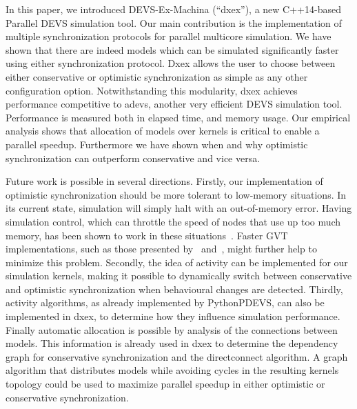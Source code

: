 In this paper, we introduced DEVS-Ex-Machina (``dxex''), a new C++14-based \textsf{Parallel DEVS} simulation tool.
Our main contribution is the implementation of multiple synchronization protocols for parallel multicore simulation.
We have shown that there are indeed models which can be simulated significantly faster using either synchronization protocol.
Dxex allows the user to choose between either conservative or optimistic synchronization as simple as any other configuration option.
Notwithstanding this modularity, dxex achieves performance competitive to adevs, another very efficient \textsf{DEVS} simulation tool.
Performance is measured both in elapsed time, and memory usage.
Our empirical analysis shows that allocation of models over kernels is critical to enable a parallel speedup. Furthermore we have shown when and why optimistic synchronization can outperform conservative and vice versa.

Future work is possible in several directions.
Firstly, our implementation of optimistic synchronization should be more tolerant to low-memory situations.
In its current state, simulation will simply halt with an out-of-memory error.
Having simulation control, which can throttle the speed of nodes that use up too much memory, has been shown to work in these situations~\cite{FujimotoBook}.
Faster GVT implementations, such as those presented by~\cite{Fujimoto:1997:CGV:268403.268404} and~\cite{Bauer:2005:SND:1069810.1070159}, might further help to minimize this problem.
Secondly, the idea of activity can be implemented for our simulation kernels, making it possible to dynamically switch between conservative and optimistic synchronization when behavioural changes are detected.
Thirdly, activity algorithms, as already implemented by PythonPDEVS, can also be implemented in dxex, to determine how they influence simulation performance.
Finally automatic allocation is possible by analysis of the connections between models. This information is already used in dxex to determine the dependency graph for conservative synchronization and the directconnect algorithm. A graph algorithm that distributes models while avoiding cycles in the resulting kernels topology could be used to maximize parallel speedup in either optimistic or conservative synchronization.